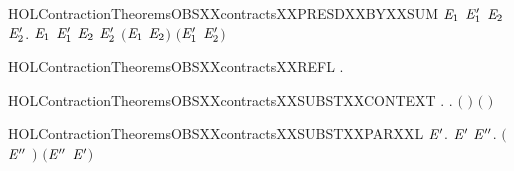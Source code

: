\begin{SaveVerbatim}{HOLContractionTheoremsOBSXXcontractsXXPRESDXXBYXXSUM}
\HOLTokenTurnstile{} \HOLSymConst{\HOLTokenForall{}}\ensuremath{\HOLBoundVar{E}\sb{\mathrm{1}}} \ensuremath{\HOLBoundVar{E}\sb{\mathrm{1}}\sp{\prime{}}} \ensuremath{\HOLBoundVar{E}\sb{\mathrm{2}}} \ensuremath{\HOLBoundVar{E}\sb{\mathrm{2}}\sp{\prime{}}}.
      \ensuremath{\HOLBoundVar{E}\sb{\mathrm{1}}} \ensuremath{\HOLBoundVar{E}\sb{\mathrm{1}}\sp{\prime{}}} \HOLSymConst{\HOLTokenConj{}}  \ensuremath{\HOLBoundVar{E}\sb{\mathrm{2}}} \ensuremath{\HOLBoundVar{E}\sb{\mathrm{2}}\sp{\prime{}}} \HOLSymConst{\HOLTokenImp{}}
      \ensuremath{(}\ensuremath{\HOLBoundVar{E}\sb{\mathrm{1}}} \HOLSymConst{\ensuremath{+}} \ensuremath{\HOLBoundVar{E}\sb{\mathrm{2}}}\ensuremath{)} \ensuremath{(}\ensuremath{\HOLBoundVar{E}\sb{\mathrm{1}}\sp{\prime{}}} \HOLSymConst{\ensuremath{+}} \ensuremath{\HOLBoundVar{E}\sb{\mathrm{2}}\sp{\prime{}}}\ensuremath{)}
\end{SaveVerbatim}
\newcommand{\HOLContractionTheoremsOBSXXcontractsXXPRESDXXBYXXSUM}{\UseVerbatim{HOLContractionTheoremsOBSXXcontractsXXPRESDXXBYXXSUM}}
\begin{SaveVerbatim}{HOLContractionTheoremsOBSXXcontractsXXREFL}
\HOLTokenTurnstile{} \HOLSymConst{\HOLTokenForall{}}.   
\end{SaveVerbatim}
\newcommand{\HOLContractionTheoremsOBSXXcontractsXXREFL}{\UseVerbatim{HOLContractionTheoremsOBSXXcontractsXXREFL}}
\begin{SaveVerbatim}{HOLContractionTheoremsOBSXXcontractsXXSUBSTXXCONTEXT}
\HOLTokenTurnstile{} \HOLSymConst{\HOLTokenForall{}} .
        \HOLSymConst{\HOLTokenImp{}}
     \HOLSymConst{\HOLTokenForall{}}.   \HOLSymConst{\HOLTokenImp{}}  \ensuremath{(} \ensuremath{)} \ensuremath{(} \ensuremath{)}
\end{SaveVerbatim}
\newcommand{\HOLContractionTheoremsOBSXXcontractsXXSUBSTXXCONTEXT}{\UseVerbatim{HOLContractionTheoremsOBSXXcontractsXXSUBSTXXCONTEXT}}
\begin{SaveVerbatim}{HOLContractionTheoremsOBSXXcontractsXXSUBSTXXPARXXL}
\HOLTokenTurnstile{} \HOLSymConst{\HOLTokenForall{}} \ensuremath{\HOLBoundVar{E}\sp{\prime{}}}.
       \ensuremath{\HOLBoundVar{E}\sp{\prime{}}} \HOLSymConst{\HOLTokenImp{}}
     \HOLSymConst{\HOLTokenForall{}}\ensuremath{\HOLBoundVar{E}\sp{\prime{}\prime{}}}.  \ensuremath{(}\ensuremath{\HOLBoundVar{E}\sp{\prime{}\prime{}}} \HOLSymConst{\ensuremath{\mid}} \ensuremath{)} \ensuremath{(}\ensuremath{\HOLBoundVar{E}\sp{\prime{}\prime{}}} \HOLSymConst{\ensuremath{\mid}} \ensuremath{\HOLBoundVar{E}\sp{\prime{}}}\ensuremath{)}
\end{SaveVerbatim}
